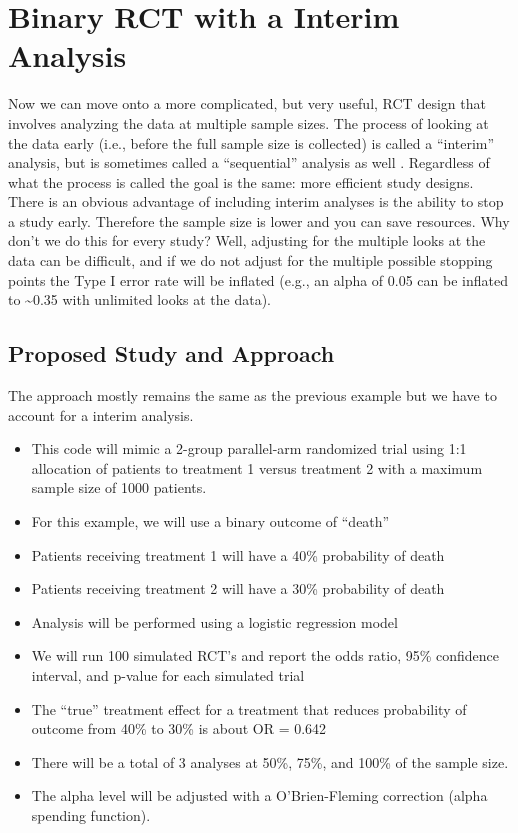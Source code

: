 \documentclass[
]{book}
\providecommand{\tightlist}{%
  \setlength{\itemsep}{0pt}\setlength{\parskip}{0pt}}
\begin{document}
\hypertarget{binary-rct-with-a-interim-analysis}{%
\section{Binary RCT with a Interim Analysis}\label{binary-rct-with-a-interim-analysis}}

Now we can move onto a more complicated, but very useful, RCT design that involves analyzing the data at multiple sample sizes. The process of looking at the data early (i.e., before the full sample size is collected) is called a ``interim'' analysis, but is sometimes called a ``sequential'' analysis as well \citep{Lakens2014, Lakens2021}. Regardless of what the process is called the goal is the same: more efficient study designs. There is an obvious advantage of including interim analyses is the ability to stop a study early. Therefore the sample size is lower and you can save resources. Why don't we do this for every study? Well, adjusting for the multiple looks at the data can be difficult, and if we do not adjust for the multiple possible stopping points the Type I error rate will be inflated (e.g., an alpha of 0.05 can be inflated to \textasciitilde0.35 with unlimited looks at the data).

\hypertarget{proposed-study-and-approach-1}{%
\subsection{Proposed Study and Approach}\label{proposed-study-and-approach-1}}

The approach mostly remains the same as the previous example but we have to account for a interim analysis.

\begin{itemize}
\tightlist
\item
  This code will mimic a 2-group parallel-arm randomized trial using 1:1 allocation of patients to treatment 1 versus treatment 2 with a maximum sample size of 1000 patients.
\item
  For this example, we will use a binary outcome of ``death''
\item
  Patients receiving treatment 1 will have a 40\% probability of death
\item
  Patients receiving treatment 2 will have a 30\% probability of death
\item
  Analysis will be performed using a logistic regression model
\item
  We will run 100 simulated RCT's and report the odds ratio, 95\% confidence interval, and p-value for each simulated trial
\item
  The ``true'' treatment effect for a treatment that reduces probability of outcome from 40\% to 30\% is about OR = 0.642
\item
  There will be a total of 3 analyses at 50\%, 75\%, and 100\% of the sample size.
\item
  The alpha level will be adjusted with a O'Brien-Fleming correction (alpha spending function).
\end{itemize}
\end{document}
